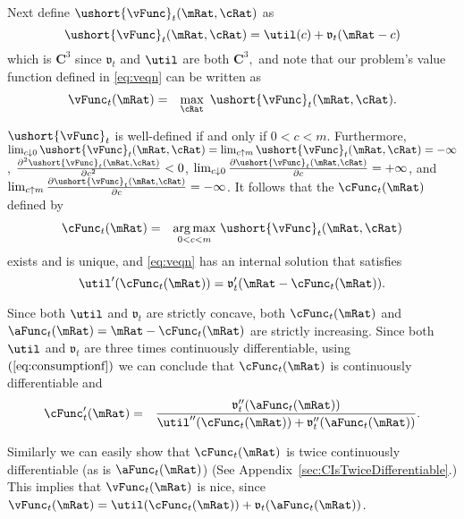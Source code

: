 \documentclass[titlepage]{\econtex}\providecommand{\texname}{BufferStockTheory}%
\begin{document}
Next define $\ushort{\vFunc}_{t}(\mRat,\cRat)$ as
\begin{equation}
\ushort{\vFunc}_{t}(\mRat,\cRat)=\util(c)+\mathfrak{v}_{t}(\mRat-c)
\end{equation}
which is $\mathbf{C}^{3}$ since $\mathfrak{v}_{t}$ and $\util$ are both
$\mathbf{C}^{3},$ and note that our problem's value function defined
in \eqref{eq:veqn} can be written as
\begin{eqnarray}
\vFunc_{t}(\mRat) &=& \max_{\cRat}~\ushort{\vFunc}_{t}(\mRat,\cRat).
\end{eqnarray}

$\ushort{\vFunc}_{t}$ is well-defined if and only if $0<c<m$.  Furthermore,
$\lim_{c \downarrow
  0}\ushort{\vFunc}_{t}(\mRat,\cRat)=\lim_{c\uparrow m} \ushort{\vFunc}_{t}(\mRat,\cRat)=-\infty $, $\frac{\partial ^{2}\ushort{\vFunc}_{t}(\mRat,\cRat)}{\partial c^{2}}%
<0$, $\lim_{c \downarrow 0}\frac{\partial \ushort{\vFunc}_{t}(\mRat,\cRat)}{\partial c}%
=+\infty $, and $\lim_{c\uparrow m} \frac{\partial \ushort{\vFunc}_{t}(\mRat,\cRat)}{%
\partial c}=-\infty $. It follows that the $\cFunc_{t}(\mRat)$ defined by
\begin{eqnarray}
\cFunc_{t}(\mRat) & = & \underset{0<c<m}{\arg \max }~\ushort{\vFunc}_{t}(\mRat,\cRat)
\end{eqnarray}
exists and is unique, and \eqref{eq:veqn} has an internal
solution that satisfies
\begin{equation}
\util^{\prime }(\cFunc_{t}(\mRat))=\mathfrak{v}_{t}^{\prime }(\mRat-\cFunc_{t}(\mRat))  \label{eq:consumptionf}.
\end{equation}


Since both $\util$ and $\mathfrak{v}_{t}$ are strictly concave, both
$\cFunc_{t}(\mRat)$ and $\aFunc_{t}(\mRat)=\mRat-\cFunc_{t}(\mRat)$
are strictly increasing. Since both $\util$ and $\mathfrak{v}_{t}$ are
three times continuously differentiable, using $\left(
  \ref{eq:consumptionf}\right) $ we can conclude that
$\cFunc_{t}(\mRat)$ is continuously differentiable and
\begin{eqnarray}
\cFunc_{t}^{\prime }(\mRat) & = & \frac{\mathfrak{v}_{t}^{\prime \prime }({\aFunc}_{t}(\mRat))  }{\util^{\prime \prime }(\cFunc_{t}(\mRat))+\mathfrak{v}_{t}^{\prime \prime }({\aFunc}_{t}(\mRat))}.
\end{eqnarray}

Similarly we can easily show that $\cFunc_{t}(\mRat)$ is twice
continuously differentiable (as is $\aFunc_{t}(\mRat)$) (See
Appendix~\ref{sec:CIsTwiceDifferentiable}.)  This implies that
$\vFunc_{t}(\mRat)$ is nice, since
$\vFunc_{t}(\mRat)=\util(\cFunc_{t}(\mRat))+\mathfrak{v}_{t}({\aFunc}_{t}(\mRat))$.
\end{document}
